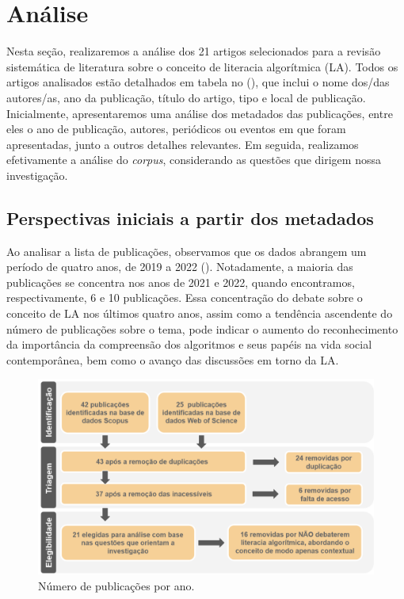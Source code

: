 \section{Análise}\label{sec-análise}

Nesta seção, realizaremos a análise dos 21 artigos selecionados para a
revisão sistemática de literatura sobre o conceito de literacia
algorítmica (LA). Todos os artigos analisados estão detalhados em tabela
no (), que inclui o nome dos/das autores/as, ano da
publicação, título do artigo, tipo e local de publicação. Inicialmente,
apresentaremos uma análise dos metadados das publicações, entre eles o
ano de publicação, autores, periódicos ou eventos em que foram
apresentadas, junto a outros detalhes relevantes. Em seguida, realizamos
efetivamente a análise do \emph{corpus}, considerando as questões que
dirigem nossa investigação.

\subsection{Perspectivas iniciais a partir dos metadados}\label{sub-sec-perspectivasiniciais}

Ao analisar a lista de publicações, observamos que os dados abrangem um
período de quatro anos, de 2019 a 2022 (). Notadamente, a
maioria das publicações se concentra nos anos de 2021 e 2022, quando
encontramos, respectivamente, 6 e 10 publicações. Essa concentração do
debate sobre o conceito de LA nos últimos quatro anos, assim como a
tendência ascendente do número de publicações sobre o tema, pode indicar
o aumento do reconhecimento da importância da compreensão dos algoritmos
e seus papéis na vida social contemporânea, bem como o avanço das
discussões em torno da LA.

\begin{figure}[!h]
\centering
\begin{minipage}{0.85\linewidth}
\caption{Número de publicações por ano.}
\label{image-02}
\includegraphics[width=\linewidth]{image1.png}
\end{minipage}
\end{figure}

